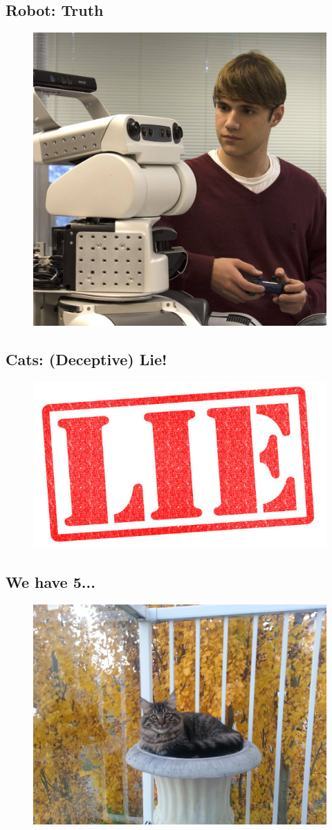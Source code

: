 \clearpage

\subsection*{Robot:  \color{green}  Truth}

\begin{figure}[h]
	\centering\includegraphics[width=0.4\linewidth]{images/robot.jpg}
\end{figure}

\clearpage

\subsection*{Cats:  \color{red}  (Deceptive) Lie!}

\begin{figure}[h]
	\centering\includegraphics[width=0.4\linewidth]{images/lie.jpg}
\end{figure}

\clearpage

\subsection*{We have 5...}

\begin{figure}[h]
	\centering\includegraphics[width=0.5\linewidth]{images/creampuff.jpg}
\end{figure}

